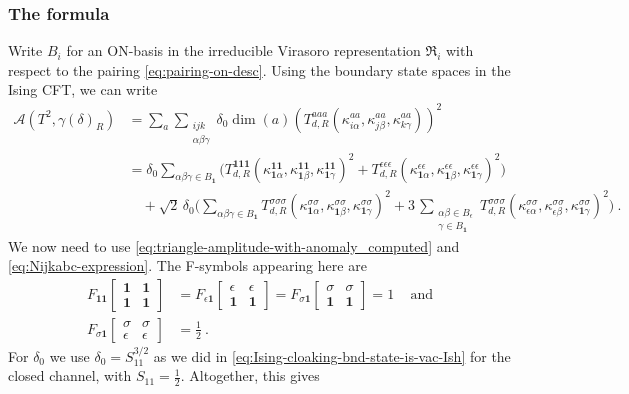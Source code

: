 \documentclass[11pt,a4paper]{article}
\numberwithin{equation}{section}
\def\Fsym#1#2#3#4#5#6{F_{#1#2}\!\begin{bmatrix}#3 & #4 \\ #5 & #6 \end{bmatrix}}
\newcommand{\one}{\mathbf{1}} %
\begin{document}
\subsubsection*{The formula}

Write $B_i$ for an ON-basis in the irreducible Virasoro representation $\mathfrak{R}_i$ with respect to the pairing \eqref{eq:pairing-on-desc}.
Using
the boundary state spaces in the Ising CFT, we can write
%
\begin{align}\nonumber
    \mathcal{A}\left(T^2,\gamma(\delta)_R\right) &= \sum_a\sum_{\begin{smallmatrix}ijk\\\alpha\beta\gamma\end{smallmatrix}} \delta_0 \dim(a)\left(T_{d,R}^{aaa}(\kappa_{i\alpha}^{aa},\kappa_{j\beta}^{aa},\kappa_{k\gamma}^{aa})\right)^2 \\
    &= \delta_0\sum\limits_{\alpha\beta\gamma\in B_\one}\Big( T^{\one\one\one}_{d,R}(\kappa^{\one\one}_{\one\alpha},\kappa^{\one\one}_{\one\beta},\kappa^{\one\one}_{\one\gamma})^2 
    + T^{\epsilon\epsilon\epsilon}_{d,R}(\kappa^{\epsilon\epsilon}_{\one\alpha},\kappa^{\epsilon\epsilon}_{\one\beta},\kappa^{\epsilon\epsilon}_{\one\gamma})^2 \Big) \\
    \nonumber
    &\quad+ \sqrt{2}\,\delta_0\Bigg(\sum\limits_{\alpha\beta\gamma\in B_\one} T^{\sigma\sigma\sigma}_{d,R}(\kappa^{\sigma\sigma}_{\one\alpha},\kappa^{\sigma\sigma}_{\one\beta},\kappa^{\sigma\sigma}_{\one\gamma})^2 + 3 \,\sum\limits_{\begin{smallmatrix}\alpha\beta\in B_\epsilon \\ \gamma\in B_\one\end{smallmatrix}} T^{\sigma\sigma\sigma}_{d,R}(\kappa^{\sigma\sigma}_{\epsilon\alpha},\kappa^{\sigma\sigma}_{\epsilon\beta},\kappa^{\sigma\sigma}_{\one\gamma})^2\Bigg) \ .
\end{align}
%
We now need to use \eqref{eq:triangle-amplitude-with-anomaly_computed} and  \eqref{eq:Nijkabc-expression}. The F-symbols appearing here are
%
\begin{align}
    \Fsym{\one}{\one}{\one}{\one}{\one}{\one} &= \Fsym{\epsilon}{\one}{\epsilon}{\epsilon}{\one}{\one}  = \Fsym{\sigma}{\one}{\sigma}{\sigma}{\one}{\one} = 1\, \quad \text{and}
    \nonumber\\
    \Fsym{\sigma}{\one}{\sigma}{\sigma}{\epsilon}{\epsilon} &= \frac12 \ .
\end{align}
%
For $\delta_0$ we use $\delta_0 = S_{11}^{3/2}$ as we did in \eqref{eq:Ising-cloaking-bnd-state-is-vac-Ish} for the closed channel, with $S_{11} = \frac12$. Altogether, this gives
\end{document}
